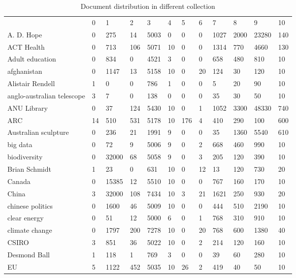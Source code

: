 
\begin{table}
\label{table:doc_stat}
\caption{Document distribution in different collection}
\begin{tabular*}{0.5\textwidth}{|p{4cm}|l|l|l|l|l|l|l|l|l|l|l|}
\cline{1-12}
	& 0 & 1 & 2 & 3 & 4 & 5 & 6 & 7 & 8 & 9 & 10 \\\cline{1-12}
A. D. Hope &0 &275 &14 &5003 &0 &0 &0 &1027 &2000 &23280 &140\\
\cline{1-12}
ACT Health &0 &713 &106 &5071 &10 &0 &0 &1314 &770 &4660 &130\\
\cline{1-12}
Adult education &0 &834 &0 &4521 &3 &0 &0 &658 &480 &810 &10\\
\cline{1-12}
afghanistan &0 &1147 &13 &5158 &10 &0 &20 &124 &30 &120 &10\\
\cline{1-12}
Alistair Rendell &1 &0 &0 &786 &1 &0 &0 &5 &20 &90 &10\\
\cline{1-12}
anglo-australian telescope &3 &7 &0 &138 &0 &0 &0 &35 &30 &50 &10\\
\cline{1-12}
ANU Library &0 &37 &124 &5430 &10 &0 &1 &1052 &3300 &48330 &740\\
\cline{1-12}
ARC &14 &510 &531 &5178 &10 &176 &4 &410 &290 &100 &600\\
\cline{1-12}
Australian sculpture &0 &236 &21 &1991 &9 &0 &0 &35 &1360 &5540 &610\\
\cline{1-12}
big data &0 &72 &9 &5006 &9 &0 &2 &668 &460 &990 &10\\
\cline{1-12}
biodiversity &0 &32000 &68 &5058 &9 &0 &3 &205 &120 &390 &10\\
\cline{1-12}
Brian Schmidt &1 &23 &0 &631 &10 &0 &12 &13 &120 &730 &20\\
\cline{1-12}
Canada &0 &15385 &12 &5510 &10 &0 &0 &767 &160 &170 &10\\
\cline{1-12}
China &3 &32000 &108 &7434 &10 &3 &21 &1621 &250 &930 &20\\
\cline{1-12}
chinese politics &0 &1600 &46 &5009 &10 &0 &0 &444 &510 &2190 &10\\
\cline{1-12}
clear energy &0 &51 &12 &5000 &6 &0 &1 &768 &310 &910 &10\\
\cline{1-12}
climate change &0 &1797 &200 &7278 &10 &0 &20 &768 &600 &1380 &40\\
\cline{1-12}
CSIRO &3 &851 &36 &5022 &10 &0 &2 &214 &120 &160 &10\\
\cline{1-12}
Desmond Ball &1 &118 &1 &769 &3 &0 &0 &39 &60 &280 &10\\
\cline{1-12}
EU &5 &1122 &452 &5035 &10 &26 &2 &419 &40 &50 &10\\

\end{tabular*}
\end{table}
